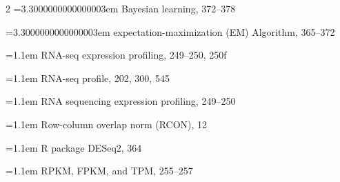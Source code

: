\begin{multicols}{2}
\noindent\hangindent=3.3000000000000003em \hspace*{2.2em}Bayesian learning, 372--378\par
\noindent\hangindent=3.3000000000000003em \hspace*{2.2em}expectation-maximization (EM) Algorithm, 365--372\par
\noindent\hangindent=1.1em RNA-seq expression profiling, 249--250, 250f\par
\noindent\hangindent=1.1em RNA-seq profile, 202, 300, 545\par
\noindent\hangindent=1.1em RNA sequencing expression profiling, 249--250\par
\noindent\hangindent=1.1em Row-column overlap norm (RCON), 12\par
\noindent\hangindent=1.1em R package DESeq2, 364\par
\noindent\hangindent=1.1em RPKM, FPKM, and TPM, 255--257\par


\end{multicols}
